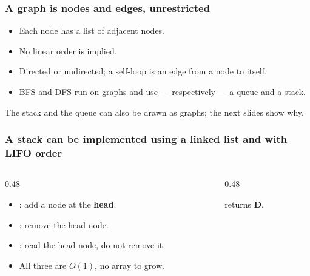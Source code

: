 \documentclass[aspectratio=169,10pt,compress]{beamer}
\begin{document}
\begin{frame}[t,fragile]\frametitle{A graph is nodes and edges, unrestricted}
  \begin{itemize}\small
    \item Each node has a list of adjacent nodes.
    \item No linear order is implied.
    \item Directed or undirected; a self-loop is an edge from a node to itself.
    \item BFS and DFS run on graphs and use --- respectively --- a queue and a stack.
  \end{itemize}
  \vspace{0.3em}
  \small
  The stack and the queue can also be drawn as graphs; the next slides show why.
\end{frame}


\begin{frame}[t,fragile]\frametitle{A stack can be implemented using a linked list and with LIFO order}
  \begin{columns}[T]
    \begin{column}{0.48\textwidth}
      \begin{itemize}\small
        \item {}: add a node at the \textbf{head}.
        \item {}: remove the head node.
        \item {}: read the head node, do not remove it.
        \item All three are $O(1)$, no array to grow.
      \end{itemize}
    \end{column}
    \begin{column}{0.48\textwidth}
      \begin{center}
      \end{center}
      \small {} returns \textbf{D}.
    \end{column}
  \end{columns}
\end{frame}
\end{document}
